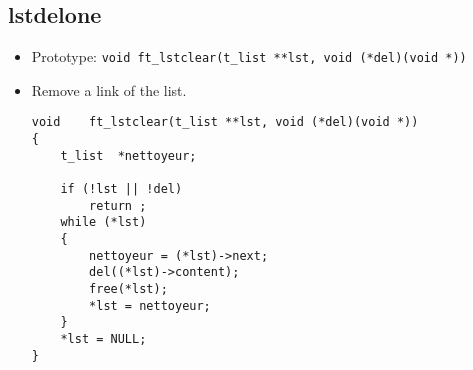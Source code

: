 \documentclass{article}
\begin{document}
		\subsection{lstdelone}
			\begin{itemize}[label=$\rightarrow$]
				\item Prototype: \texttt{void    ft\_lstclear(t\_list **lst, void (*del)(void *))}
				\item Remove a link of the list.
				\begin{verbatim}
void    ft_lstclear(t_list **lst, void (*del)(void *))                          
{                                                                               
    t_list  *nettoyeur;                                                         
                                                                                
    if (!lst || !del)                                                           
        return ;                                                                
    while (*lst)                                                                
    {                                                                           
        nettoyeur = (*lst)->next;                                               
        del((*lst)->content);                                                   
        free(*lst);                                                             
        *lst = nettoyeur;                                                       
    }                                                                           
    *lst = NULL;                                                                
}
				\end{verbatim}
			\end{itemize}
		
\end{document}
